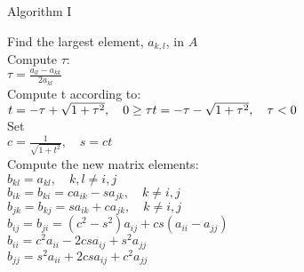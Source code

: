 \documentclass[11pt,a4paper,english]{article}
\numberwithin{equation}{section}
\begin{document}
\centerline{Algorithm I}
\begin{tcolorbox}
Find the largest element, $a_{k,l}$, in $A$ \\
Compute $\tau:$ \\
$ \tau = \frac{a_{ll}-a_{kk}}{2a_{kl}}$ \\
Compute t according to:  \\
$t=  -\tau + \sqrt{1+\tau^2}, \quad   0  \geq \tau \\
t=  -\tau - \sqrt{1+\tau^2}, \quad   \tau <  0 $ \\
Set \\
$ c= \frac{1}{\sqrt{1+t^2}}, \quad s= ct$ \\
Compute the new matrix elements: \\
$ b_{kl} = a_{kl}, \quad k,l \neq i,j$ \\
$ b_{ik} = b_{ki} = ca_{ik}-sa_{jk}, \quad k \neq i,j$ \\
$ b_{jk} = b_{kj} = sa_{ik}+ca_{jk}, \quad k \neq i,j$ \\
$ b_{ij} = b_{ji} = (c^2 - s^2)a_{ij} + cs(a_{ii}-a_{jj}) $ \\
$ b_{ii} = c^2 a_{ii} - 2csa_{ij} + s^2 a_{jj} $ \\
$ b_{jj} = s^2 a_{ii} + 2csa_{ij} + c^2 a_{jj} $ \\

\end{tcolorbox} 
\end{document}

